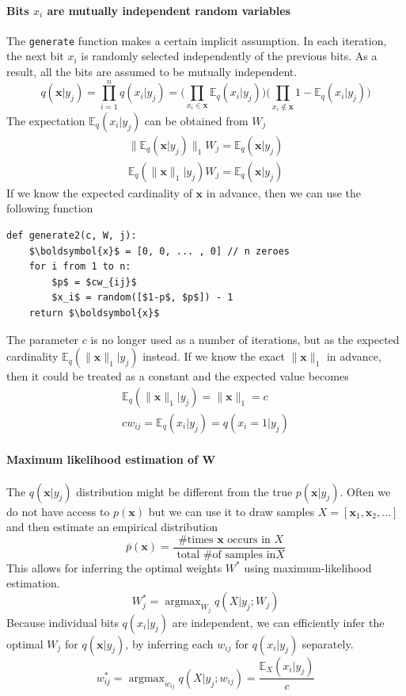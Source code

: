 \documentclass[12pt]{article}
\DeclareMathOperator*{\argmax}{argmax}
\begin{document}
\paragraph{Bits $x_i$ are mutually independent random variables} The \texttt{generate} function makes a certain implicit assumption. In each iteration, the next bit $x_i$ is randomly selected independently of the previous bits. As a result, all the bits are assumed to be mutually independent. 
\[
q(\boldsymbol{x}|y_j) = \prod_{i=1}^{n} q(x_i|y_j) = \big(\prod_{x_i\in\boldsymbol{x}} \mathbb{E}_q(x_i|y_j) \big) \big(\prod_{x_i\notin\boldsymbol{x}} 1-\mathbb{E}_q(x_i|y_j) \big)
\]
The expectation $\mathbb{E}_q(x_i|y_j) $ can be obtained from $W_j$ 
\begin{gather*}
\lVert \mathbb{E}_q(\boldsymbol{x}|y_j) \rVert _1 W_j = \mathbb{E}_q(\boldsymbol{x}|y_j) \\
\mathbb{E}_q(\lVert  \boldsymbol{x} \rVert _1|y_j)  W_j = \mathbb{E}_q(\boldsymbol{x}|y_j) 
\end{gather*}
If we know the expected cardinality of $\boldsymbol{x}$ in advance, then we can use the following function
\begin{lstlisting}
def generate2(c, W, j):
    $\boldsymbol{x}$ = [0, 0, ... , 0] // n zeroes
    for i from 1 to n:
        $p$ = $cw_{ij}$
        $x_i$ = random([$1-p$, $p$]) - 1
    return $\boldsymbol{x}$
\end{lstlisting}
The parameter $c$ is no longer used as a number of iterations, but as the expected cardinality $\mathbb{E}_q(\lVert  \boldsymbol{x} \rVert _1|y_j)$ instead. If we know the exact $\lVert  \boldsymbol{x} \rVert _1$ in advance, then it could be treated as a constant and the expected value becomes 
\begin{gather*}
\mathbb{E}_q(\lVert  \boldsymbol{x} \rVert _1|y_j)= \lVert  \boldsymbol{x} \rVert _1 = c \\
c w_{ij} = \mathbb{E}_q(x_i|y_j) = q(x_i{=}1|y_j)
\end{gather*}
\paragraph{Maximum likelihood estimation of W}
The $q(\boldsymbol{x}|y_j)$ distribution might be different from the true  $p(\boldsymbol{x}|y_j)$. Often we do not have access to $p(\boldsymbol{x})$ but we can use it to draw samples $X=[\boldsymbol{x}_1,\boldsymbol{x}_2,...]$  and then estimate an empirical distribution 
\[\bar{p}(\boldsymbol{x})=\frac{\text{ \# times }\boldsymbol{x}\text{ occurs in }X}{\text{ total \# of samples in}X}
\] 
This allows for inferring the optimal weights $W^*$ using maximum-likelihood estimation. 
\[
W_j^* = \argmax_{W_j}q(X|y_j;W_j)
\]
Because individual bits $q(x_i|y_j)$ are independent, we can efficiently infer the optimal $W_j$ for $q(\boldsymbol{x}|y_j)$, by inferring each $w_{ij}$ for $q(x_i|y_j)$ separately. 
\[
w_{ij}^* = \argmax_{w_{ij}}q(X|y_j;w_{ij}) = \frac{\mathbb{E}_X(x_i|y_j)}{c}
\]
\end{document}
